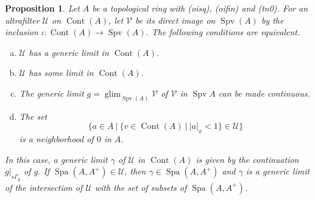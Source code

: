 \documentclass[8pt]{article}
\numberwithin{equation}{section}
\newtheorem{proposition}{Proposition}[subsection]
\DeclareMathOperator{\Spa}{Spa}
\DeclareMathOperator{\glim}{glim}
\DeclareMathOperator{\Spv}{Spv}
\DeclareMathOperator{\Cont}{Cont}
\newcommand{\U}[0]{\mathcal{U}}
\newcommand{\sep}[0]{\:|\:}
\newcommand{\ab}[1]{\vert #1 \vert}
\newcommand{\cV}[0]{\mathcal{V}}
\begin{document}
\begin{proposition}
    \label{proposition_14_4}
    Let $A$ be a topological ring with (oisq), (oifin) and (tn0). For an ultrafilter $\U$ on $\Cont(A)$, let $\cV$ be its direct image on $\Spv(A)$ by the inclusion $\iota:\Cont(A)\to\Spv(A)$. The following conditions are equivalent.
    \begin{enumerate}[a.]
        \item $\U$ has a generic limit in $\Cont(A)$.
        \item $\U$ has some limit in $\Cont(A)$. 
        \item The generic limit $g=\glim_{\Spv(A)}\cV$ of $\cV$ in $\Spv A$ can be made continuous.%
        \item The set 
        \begin{equation}
            \{a\in A\sep \{v\in\Cont(A)\sep \ab{a}_x<1\}\in\U\}
            \label{equation_14_4}
        \end{equation}
        is a neighborhood of $0$ in $A$.
    \end{enumerate}
    In this case, a generic limit $\gamma$ of $\U$ in $\Cont(A)$ is given by the continuation $g|_{s\Gamma_g}$ of $g$. If $\Spa(A,A^+)\in\U$, then $\gamma\in\Spa(A,A^+)$ and $\gamma$ is a generic limit of the intersection of $\U$ with the set of subsets of $\Spa(A,A^+)$.
\end{proposition}
\end{document}
